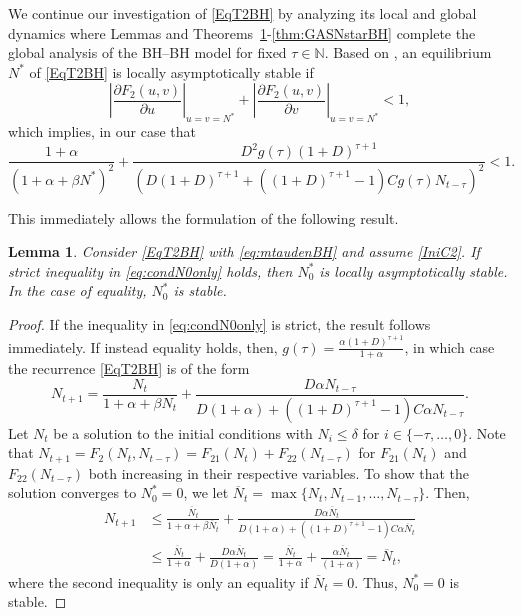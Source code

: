 \documentclass{article}
\numberwithin{theorem}{section}
\newtheorem{lemma}[theorem]{Lemma}
\begin{document}
{We continue our investigation of \eqref{EqT2BH} by analyzing its local and global dynamics where Lemmas and Theorems~\ref{T2N0}-\ref{thm:GASNstarBH} complete the global analysis of the BH--BH model for fixed  $\tau\in \mathbb{N}$. Based on \cite{Clark1976}, an equilibrium $N^*$ of \eqref{EqT2BH} is locally asymptotically stable if 
$$\left|\frac{\partial F_2(u,v)}{\partial u}\right|_{u=v=N^*}+\left|\frac{\partial F_2(u,v)}{\partial v}\right |_{u=v=N^*}<1,$$
which implies, in our case that 
\begin{equation}\label{T2Clark}
    \frac{1+\alpha}{(1+\alpha+\beta N^*)^2} + 
\frac{D^2 g(\tau)(1+D)^{\tau+1} }{(D(1+D)^{\tau+1}+((1+D)^{\tau+1}-1)Cg(\tau)N_{t-\tau})^2} <1.
\end{equation}

This immediately allows the formulation of the following result. 
\begin{lemma}\label{T2N0}
    Consider \eqref{EqT2BH} with \eqref{eq:mtaudenBH} and assume \eqref{IniC2}. If strict inequality in \eqref{eq:condN0only} holds, then $N^*_0$ is locally asymptotically stable. In the case of equality, $N^*_0$ is stable.   
\end{lemma}


\begin{proof}
    If the inequality in \eqref{eq:condN0only} is strict, the result follows immediately. If instead equality holds, then, $g(\tau)=\frac{\alpha (1+D)^{\tau+1}}{1+\alpha}$, in which case the recurrence \eqref{EqT2BH} is of the form 
    $$N_{t+1}=\frac{N_t}{1+\alpha+\beta N_t}+\frac{D\alpha N_{t-\tau}}{D(1+\alpha)+((1+D)^{\tau+1}-1)C\alpha N_{t-\tau}}.$$
Let $N_t$ be a solution to the initial conditions with $N_i\leq \delta$ for $i\in \{-\tau, \ldots, 0\}$. 
Note that  $N_{t+1}=F_2(N_t,N_{t-\tau})=F_{21}(N_t)+F_{22}(N_{t-\tau})$ for $F_{21}(N_t)$ and $F_{22}(N_{t-\tau})$ both increasing  in their respective variables. 
To show that the solution converges to $N^*_0=0$, we let $\overline{N}_t=\max\{N_t, N_{t-1},\ldots, N_{t-\tau}\}$. Then, 
\begin{align*}
N_{t+1}&\leq \frac{\overline{N}_t}{1+\alpha+\beta \overline{N}_t}+\frac{D\alpha \overline{N}_{t}}{D(1+\alpha)+((1+D)^{\tau+1}-1)C\alpha \overline{N}_{t}}\\
&\leq  \frac{\overline{N}_t}{1+\alpha}+\frac{D\alpha \overline{N}_{t}}{D(1+\alpha)}=\frac{\overline{N}_t}{1+\alpha}+\frac{\alpha \overline{N}_{t}}{(1+\alpha)}=\overline{N}_t,
\end{align*}
where the second inequality is only an equality if $\overline{N}_t=0$. Thus, $N^*_0=0$ is stable. 
\end{proof}

}
\end{document}
